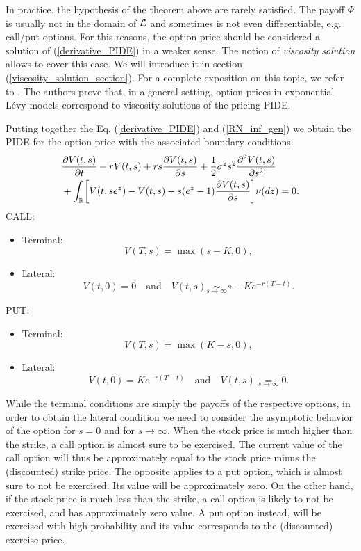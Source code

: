 In practice, the hypothesis of the theorem above are rarely satisfied. 
The payoff $\Phi$ is usually not in the domain of $\mathcal{L}$ and sometimes is not even differentiable, e.g. call/put options.   
For this reasons, the option price should be considered a solution of (\ref{derivative_PIDE}) in a weaker sense. 
The notion of \emph{viscosity solution} allows to cover this case.
We will introduce it in section (\ref{viscosity_solution_section}). 
For a complete exposition on this topic, we refer to \cite{CoVo05}.  The authors prove that, in a general setting,
option prices in exponential Lévy models correspond to viscosity solutions of the pricing PIDE.

Putting together the Eq. (\ref{derivative_PIDE}) and (\ref{RN_inf_gen}) we obtain the PIDE for the option price with the associated boundary conditions.
\begin{align}\label{PIDE_option}
&  \frac{\partial V(t,s)}{\partial t} - r V(t,s) + r s \frac{\partial V(t,s)}{\partial s}
+ \frac{1}{2} \sigma^2 s^2 \frac{\partial^2  V(t,s)}{\partial s^2}  \\ \nonumber
&+ \int_{\mathbb{R}} \biggl[ V(t,se^z) - V(t,s) - s(e^z-1)\frac{\partial V(t,s)}{\partial s} \biggr] \nu(dz) = 0.
\end{align}
CALL:
\begin{itemize}
 \item Terminal:
 $$ V(T,s) = \max(s-K,0), $$
 \item Lateral:
 $$ V(t,0) = 0 \quad \mbox{and} \quad V(t, s) \underset{s \to \infty}{\sim} s - Ke^{-r(T-t)}. $$
\end{itemize}
PUT:
\begin{itemize}
 \item Terminal:
 $$ V(T,s) = \max(K-s,0), $$
 \item Lateral:
 $$ V(t,0) = Ke^{-r(T-t)} \quad \mbox{and} \quad V(t, s) \underset{s \to \infty}{=} 0. $$
\end{itemize}
While the terminal conditions are simply the payoffs of the respective options, in order to obtain the lateral condition we need to consider the asymptotic behavior
of the option for $s=0$ and for $s\to \infty$.
When the stock price is much higher than the strike, a call option is almost sure to be exercised. 
The current value of the call option will thus be approximately equal to the stock price minus the (discounted) strike price. 
The opposite applies to a put option, which is almost sure to not be exercised. Its value will be approximately zero.
On the other hand, if the stock price is much less than the strike, a call option is likely to not be exercised, and has approximately zero value.
A put option instead, will be exercised with high probability and its value corresponds to the (discounted) exercise price.


